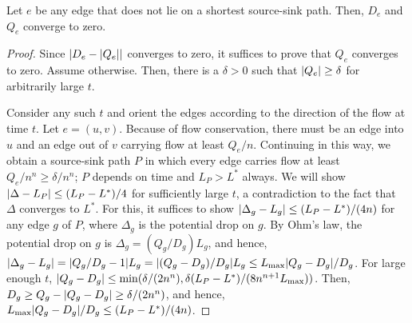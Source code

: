 \documentclass[11pt,a4paper]{article}
\newcommand{\Lmax}{\ensuremath{L_{\mathrm{max}}}}
\begin{document}
\begin{lemma}\label{edges outside shortest paths die} 
Let $e$ be any edge that does not lie on a shortest source-sink
path. Then, $D_e$ and $Q_e$ converge to zero. \end{lemma}
\begin{proof} Since $| D_e - | Q_e | |$ converges to zero, it suffices to
prove that $Q_e$ converges to zero. Assume otherwise. Then, there is a
$\delta > 0$ such that $| Q_e | \ge \delta$ for arbitrarily large
$t$. 

Consider any such $t$ and orient the edges according to the direction of the
flow at time $t$. Let $e = (u,v)$. Because of flow conservation, there must be
an edge into $u$ and an edge out of $v$ carrying flow at least
$Q_e/n$. Continuing in this way, we obtain a source-sink path $P$ in which
every edge carries flow at least $Q_e/n^n \ge \delta/n^n$; $P$ depends on
time and $L_P > L^*$ always. We will show $| \Delta -
L_{P} | \le (L_P - L^*)/4$ for sufficiently large $t$, a contradiction to the fact that
$\Delta$ converges to $L^*$. 
For this, it suffices to show $| \Delta_g - L_g |
\le (L_P - L^*)/(4n)$ for any edge $g$ of $P$, where $\Delta_g$ is the potential
drop on $g$. By Ohm's law, the potential drop on $g$ is $\Delta_g = (Q_g/D_g)
L_g$, and hence, $\abs{\Delta_g - L_g} = \abs{Q_g/D_g - 1} L_g = \abs{(Q_g -
D_g)/D_g} L_g \le \Lmax \abs{Q_g - D_g}/D_g$. For large enough $t$, $\abs{Q_g -
D_g} \le \min(\delta/(2n^n),\delta (L_P - L^*)/(8 n^{n+1}\Lmax))$. Then, 
$D_g \ge Q_g - | Q_g - D_g | \ge
\delta/(2n^n)$, and hence, 
$\Lmax \abs{Q_g - D_g}/D_g \le (L_P - L^*)/(4n)$. \end{proof}
\end{document}
